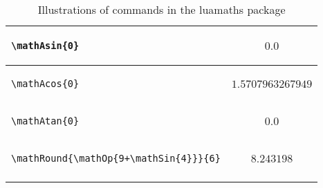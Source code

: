 \documentclass{article}
\begin{document}
\begin{center}
\begin{longtable}{lc}
\begin{lstlisting}
\mathAsin{0}
\end{lstlisting} & \(0.0\)\\
\midrule

\begin{lstlisting}
\mathAcos{0}
\end{lstlisting} & \(1.5707963267949\)\\
\midrule

\begin{lstlisting}
\mathAtan{0}
\end{lstlisting} & \(0.0\)\\
\midrule

\begin{lstlisting}
\mathRound{\mathOp{9+\mathSin{4}}}{6}
\end{lstlisting} & \(8.243198\)\\
\midrule
\caption{Illustrations of commands in the luamaths package}
\label{tbl:illluamaths}
\end{longtable}
\end{center}

\printbibliography
\end{document}
